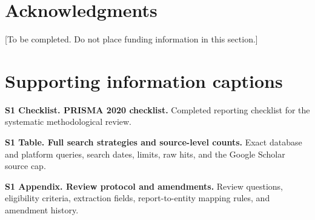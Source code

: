\documentclass[10pt,letterpaper]{article}
\begin{document}
\section*{Acknowledgments}
[To be completed. Do not place funding information in this section.]



\section*{Supporting information captions}
\textbf{S1 Checklist. PRISMA 2020 checklist.} Completed reporting checklist for the systematic methodological review.

\textbf{S1 Table. Full search strategies and source-level counts.} Exact database and platform queries, search dates, limits, raw hits, and the Google Scholar source cap.

\textbf{S1 Appendix. Review protocol and amendments.} Review questions, eligibility criteria, extraction fields, report-to-entity mapping rules, and amendment history.
\end{document}
